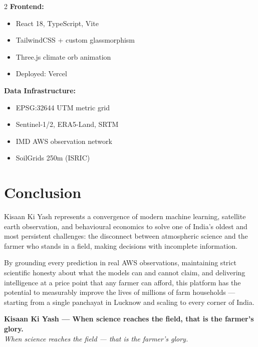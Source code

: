 \documentclass[12pt,a4paper]{article}
\begin{document}
\begin{multicols}{2}
\textbf{Frontend:}
\begin{itemize}[leftmargin=*,noitemsep]
  \item React 18, TypeScript, Vite
  \item TailwindCSS + custom glassmorphism
  \item Three.js climate orb animation
  \item Deployed: Vercel
\end{itemize}

\columnbreak

\textbf{Data Infrastructure:}
\begin{itemize}[leftmargin=*,noitemsep]
  \item EPSG:32644 UTM metric grid
  \item Sentinel-1/2, ERA5-Land, SRTM
  \item IMD AWS observation network
  \item SoilGrids 250m (ISRIC)
\end{itemize}
\end{multicols}

\section*{Conclusion}

Kisaan Ki Yash represents a convergence of modern machine learning, satellite earth observation, and behavioural economics to solve one of India's oldest and most persistent challenges: the disconnect between atmospheric science and the farmer who stands in a field, making decisions with incomplete information.

By grounding every prediction in real AWS observations, maintaining strict scientific honesty about what the models can and cannot claim, and delivering intelligence at a price point that any farmer can afford, this platform has the potential to measurably improve the lives of millions of farm households --- starting from a single panchayat in Lucknow and scaling to every corner of India.

\vspace{0.5cm}

\begin{center}
{\large\bfseries\color{primaryGreen} Kisaan Ki Yash --- When science reaches the field, that is the farmer's glory.}\\
\textit{When science reaches the field --- that is the farmer's glory.}
\end{center}
\end{document}
